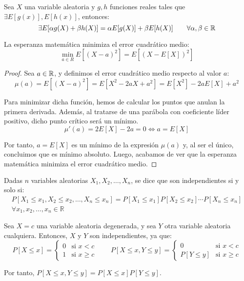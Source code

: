 \begin{coro}
    Sea $X$ una variable aleatoria y $g, h$ funciones reales tales que $\exists E[g(x)], E[h(x)]$, entonces:
    $$\exists E[\alpha g(X) + \beta h(X)] = \alpha E[g(X)] + \beta E[h(X)] \qquad \forall \alpha, \beta \in \mathbb R$$
\end{coro}

\begin{prop}
    La esperanza matemática minimiza el error cuadrático medio:
    $$\min_{a \in R} E[(X-a)^2] = E[(X-E[X])^2]$$
\end{prop}
\begin{proof}
    Sea $a \in \mathbb R$, y definimos el error cuadrático medio respecto al valor $a$:
    $$\mu(a) = E[(X-a)^2] = E[X^2-2aX+a^2] = E[X^2] - 2aE[X] + a^2$$

    Para minimizar dicha función, hemos de calcular los puntos que anulan la primera derivada. Además, al tratarse de una parábola con coeficiente líder positivo, dicho punto crítico será un mínimo.
    $$\mu'(a) = 2E[X] - 2a = 0 \Longleftrightarrow a = E[X]$$

    Por tanto, $a=E[X]$ es un mínimo de la expresión $\mu(a)$ y, al ser el único, concluimos que es mínimo absoluto.
    Luego, acabamos de ver que la esperanza matemática minimiza el error cuadrático medio.
\end{proof}



\begin{definicion}
    Dadas $n$ variables aleatorias $X_1,X_2,\ldots,X_n$, se dice que son independientes si y solo si:
    \begin{multline*}
        P[X_1\leq x_1, X_2\leq x_2,\ldots, X_n\leq x_n] = P[X_1\leq x_1]P[X_2\leq x_2]\cdots P[X_n\leq x_n] \\ \forall x_1,x_2,\ldots,x_n\in \mathbb{R}
    \end{multline*}    
\end{definicion}
\begin{ejemplo}
    Sea $X=c$ una variable aleatoria degenerada, y sea $Y$ otra variable aleatoria cualquiera. Entonces, $X$ y $Y$ son independientes, ya que:
    \begin{equation*}
        P[X\leq x] = \begin{cases}
            0 & \text{si } x< c \\
            1 & \text{si } x\geq c
        \end{cases}
        \qquad
        P[X\leq x, Y\leq y] = \begin{cases}
            0 & \text{si } x< c \\
            P[Y\leq y] & \text{si } x\geq c
        \end{cases}
    \end{equation*}

    Por tanto, $P[X\leq x, Y\leq y] = P[X\leq x]P[Y\leq y]$.
\end{ejemplo}

